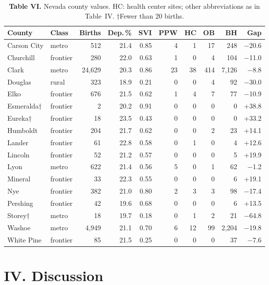 \documentclass{article}
\begin{document}
\begin{table}
\centering
\caption{\textbf{Table VI.} Nevada county values. HC: health center sites; other abbreviations as in Table~IV. †Fewer than 20 births.}

\begin{tabular}{@{}llrrrrrrrr@{}}
\toprule
County & Class & Births & Dep.\,\% & SVI & PPW & HC & OB & BH & Gap \\
\midrule
Carson City & metro & 512 & 21.4 & 0.85 & 4 & 1 & 17 & 248 & −20.6 \\
Churchill & frontier & 280 & 22.0 & 0.63 & 1 & 0 & 4 & 104 & −11.0 \\
Clark & metro & 24,629 & 20.3 & 0.86 & 23 & 38 & 414 & 7,126 & −8.8 \\
Douglas & rural & 323 & 18.9 & 0.21 & 0 & 0 & 4 & 92 & −30.0 \\
Elko & frontier & 676 & 21.5 & 0.62 & 1 & 4 & 7 & 77 & −10.9 \\
Esmeralda† & frontier & 2 & 20.2 & 0.91 & 0 & 0 & 0 & 0 & +38.8 \\
Eureka† & frontier & 18 & 23.5 & 0.43 & 0 & 0 & 0 & 0 & +33.2 \\
Humboldt & frontier & 204 & 21.7 & 0.62 & 0 & 0 & 2 & 23 & +14.1 \\
Lander & frontier & 61 & 22.8 & 0.58 & 0 & 1 & 0 & 4 & +12.6 \\
Lincoln & frontier & 52 & 21.2 & 0.57 & 0 & 0 & 0 & 5 & +19.9 \\
Lyon & metro & 622 & 21.4 & 0.56 & 5 & 0 & 1 & 62 & −1.2 \\
Mineral & frontier & 33 & 22.3 & 0.55 & 0 & 0 & 0 & 6 & +19.1 \\
Nye & frontier & 382 & 21.0 & 0.80 & 2 & 3 & 3 & 98 & −17.4 \\
Pershing & frontier & 42 & 19.6 & 0.68 & 0 & 0 & 0 & 6 & +13.5 \\
Storey† & metro & 18 & 19.7 & 0.18 & 0 & 1 & 2 & 21 & −64.8 \\
Washoe & metro & 4,949 & 21.1 & 0.70 & 6 & 12 & 99 & 2,204 & −19.8 \\
White Pine & frontier & 85 & 21.5 & 0.25 & 0 & 0 & 0 & 37 & −7.6 \\
\bottomrule
\end{tabular}
\end{table}

\section*{IV. Discussion}
\end{document}
